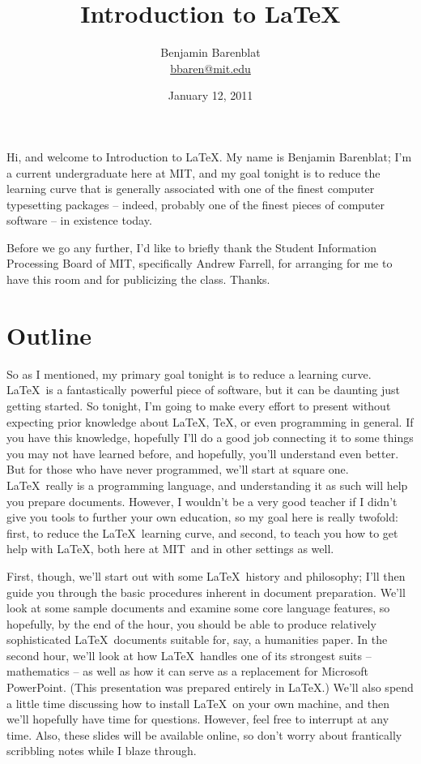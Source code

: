 \documentclass[ignorenonframetext]{beamer}
\title{Introduction to \LaTeX}
\author[Benjamin Barenblat]{Benjamin Barenblat\\\url{bbaren@mit.edu}}
\institute[\abbr{SIPB}/\mit]{%
  Student Information Processing Board\\Massachusetts Institute of Technology}
\date{January 12, 2011}
\newcommand{\abbr}[1]{#1}
\renewcommand{\mit}{\abbr{MIT}}
\begin{document}
\maketitle

Hi, and welcome to Introduction to \LaTeX.  My name is Benjamin
Barenblat; I'm a current undergraduate here at \mit, and my goal
tonight is to reduce the learning curve that is generally associated
with one of the finest computer typesetting packages -- indeed,
probably one of the finest pieces of computer software -- in existence
today.

Before we go any further, I'd like to briefly thank the Student
Information Processing Board of \mit, specifically Andrew
Farrell, for arranging for me to have this room and for publicizing
the class.  Thanks.

\begin{frame}
  \titlepage
\end{frame}

\section*{Outline}
So as I mentioned, my primary goal tonight is to reduce a learning
curve.  \LaTeX\ is a fantastically powerful piece of software, but it
can be daunting just getting started.  So tonight, I'm going to make
every effort to present without expecting prior knowledge about
\LaTeX, \TeX, or even programming in general.  If you have this
knowledge, hopefully I'll do a good job connecting it to some things
you may not have learned before, and hopefully, you'll understand even
better.  But for those who have never programmed, we'll start at
square one.  \LaTeX\ really is a programming language, and
understanding it as such will help you prepare documents.  However, I
wouldn't be a very good teacher if I didn't give you tools to further
your own education, so my goal here is really twofold: first, to
reduce the \LaTeX\ learning curve, and second, to teach you how to get
help with \LaTeX, both here at \mit\ and in other settings as well.

First, though, we'll start out with some \LaTeX\ history and
philosophy; I'll then guide you through the basic procedures inherent
in document preparation.  We'll look at some sample documents and
examine some core language features, so hopefully, by the end of the
hour, you should be able to produce relatively sophisticated
\LaTeX\ documents suitable for, say, a humanities paper.  In the
second hour, we'll look at how \LaTeX\ handles one of its strongest
suits -- mathematics -- as well as how it can serve as a replacement
for Microsoft PowerPoint.  (This presentation was prepared entirely in
\LaTeX.)  We'll also spend a little time discussing how to install
\LaTeX\ on your own machine, and then we'll hopefully have time for
questions.  However, feel free to interrupt at any time.  Also, these
slides will be available online, so don't worry about frantically
scribbling notes while I blaze through.
\end{document}
